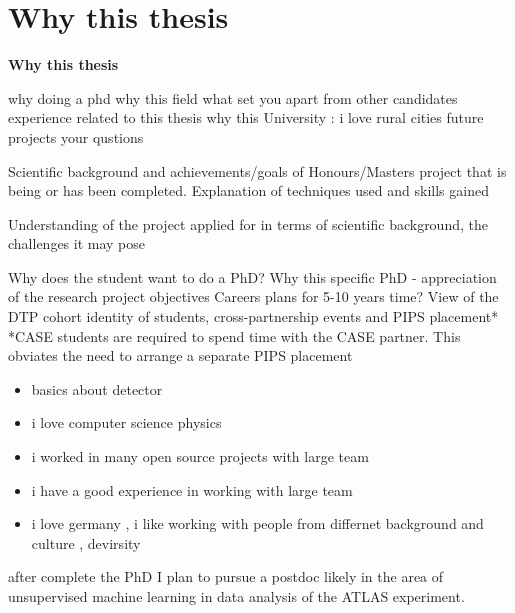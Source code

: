 \documentclass[11pt,aspectratio=169]{beamer}
\begin{document}
\section{Why this thesis}


\begin{frame}{\underline{\secname}}
	

	\begin{center}
		\textbf{Why this thesis}
	\end{center}
	
	why doing a phd
	why this field
	what set you apart from other candidates
	experience related to this thesis
	why this University  : i love rural cities
	future projects
	your qustions
	
	
	Scientific background and achievements/goals of Honours/Masters project that is being or has been completed. Explanation of techniques used and skills gained
	
	Understanding of the project applied for in terms of scientific background, the challenges it may pose
	
	Why does the student want to do a PhD?
Why this specific PhD - appreciation of the research project objectives
Careers plans for 5-10 years time?
View of the DTP cohort identity of students, cross-partnership events and PIPS placement*
*CASE students are required to spend time with the CASE partner. This obviates the need to arrange a separate PIPS placement 
	
\begin{itemize}
\setlength\itemsep{0em}
\item basics about detector
\item i love computer science physics
\item i worked in many open source projects  with large team
\item i have a good  experience   in working with large team
\item i love germany , i  like working with people from differnet background and culture , devirsity
\end{itemize}

	\begin{center}
		\textbf{}
	\end{center}
	after complete the PhD I plan to pursue a postdoc likely in the area of unsupervised machine learning in data analysis of the ATLAS experiment.
	
\end{frame}
\end{document}
